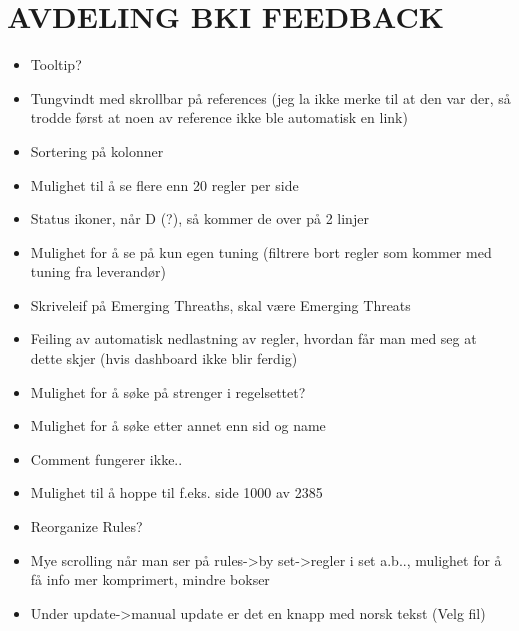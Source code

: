 \chapter{AVDELING BKI FEEDBACK}
\label{app:bki_feedback}

\begin{itemize}
\item Tooltip?
\item Tungvindt med skrollbar på references (jeg la ikke merke til at den var der, så trodde først at noen av reference ikke ble automatisk en link)
\item Sortering på kolonner
\item Mulighet til å se flere enn 20 regler per side
\item Status ikoner, når D (?), så kommer de over på 2 linjer
\item Mulighet for å se på kun egen tuning (filtrere bort regler som kommer med tuning fra leverandør)
\item Skriveleif på Emerging Threaths, skal være Emerging Threats
\item Feiling av automatisk nedlastning av regler, hvordan får man med seg at dette skjer (hvis dashboard ikke blir ferdig)
\item Mulighet for å søke på strenger i regelsettet?
\item Mulighet for å søke etter annet enn sid og name
\item Comment fungerer ikke..
\item Mulighet til å hoppe til f.eks. side 1000 av 2385
\item Reorganize Rules?
\item Mye scrolling når man ser på rules->by set->regler i set a.b.., mulighet for å få info mer komprimert, mindre bokser
\item Under update->manual update er det en knapp med norsk tekst (Velg fil)
\end{itemize}
